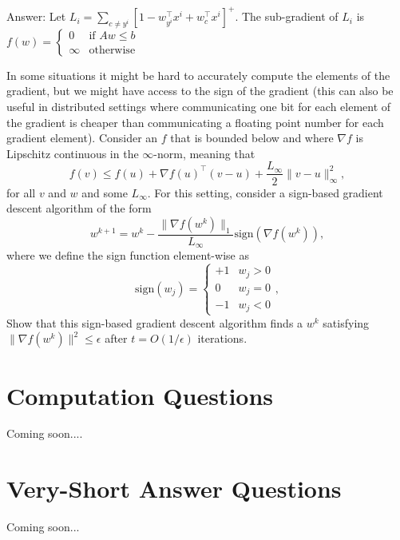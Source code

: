 \documentclass{article}
\def\blu#1{{\color{blu}#1}}
\def\gre#1{{\color{gre}#1}}
\def\red#1{{\color{red}#1}}
\def\norm#1{\|#1\|}
\begin{document}
{\gre{
\\Answer: Let $L_i = \sum_{c \neq y^i}[1 - w_{y^i}^\top x^i + w_c^\top x^i]^+$. The sub-gradient of $L_i$ is \\
$f(w) = \begin{cases}0 & \text{if $Aw \leq b$}\\\infty & \text{otherwise}\end{cases}$
}
\item In some situations it might be hard to accurately compute the elements of the gradient, but we might have access to the sign of the gradient (this can also be useful in distributed settings where communicating one bit for each element of the gradient is cheaper than communicating a floating point number for each gradient element). 
Consider an $f$ that is bounded below and where $\nabla f$ is Lipschitz continuous in the $\infty$-norm, meaning that
\[
f(v) \leq f(u) + \nabla f(u)^\top (v-u) + \frac{L_\infty}{2}\norm{v-u}_\infty^2,
\]
for all $v$ and $w$ and some $L_\infty$. 
For this setting, consider a sign-based gradient descent algorithm of the form
\[
w^{k+1} = w^k - \frac{\norm{\nabla f(w^k)}_1}{L_\infty}\text{sign}(\nabla f(w^k)),
\]
where we define the sign function element-wise as
\[
\text{sign}(w_j) = \begin{cases}+1 & w_j > 0\\0 & w_j =0\\-1 & w_j < 0\end{cases},
\]
\blu{Show that this sign-based gradient descent algorithm finds a $w^k$ satisfying \red{$\norm{\nabla f(w^k)}^2 \leq \epsilon$} after $t = O(1/\epsilon)$ iterations.}
}


\section{Computation Questions}

Coming soon....





\section{Very-Short Answer Questions}

Coming soon...



 
\end{document}
